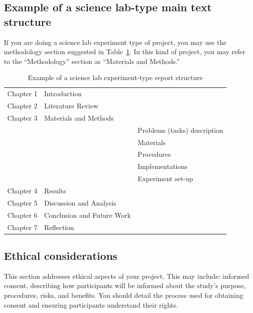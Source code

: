 \subsection{Example of a science lab-type main text structure}
If you are doing a science lab experiment type of project, you may
use the  methodology section suggested in Table~\ref{tab:lab_temp}.
In this kind of project, you may refer to the ``Methodology'' section
as ``Materials and Methods.''
\begin{table}[!ht]
  \centering
  \caption{Example of a science lab experiment-type report structure}
  \label{tab:lab_temp}
  \begin{tabular}{lll}
    \toprule
    Chapter 1 & Introduction  &    \\
    Chapter 2 & Literature Review  &    \\
    Chapter 3 & Materials and Methods   &    \\
    &               & Problems (tasks) description  \\
    &               & Materials \\
    &               & Procedures  \\
    &               & Implementations   \\
    &               & Experiment set-up   \\
    Chapter 4 & Results       &  \\
    Chapter 5 & Discussion and Analysis  &    \\
    Chapter 6 & Conclusion and Future Work  &    \\
    Chapter 7 & Reflection  &    \\
    \bottomrule
  \end{tabular}
\end{table}

\subsection{Ethical considerations}
This section addresses ethical aspects of your project. This may include:
informed consent, describing how participants will be informed about
the study's purpose, procedures, risks, and benefits. You should
detail the process used for obtaining consent and ensuring
participants understand their rights.

